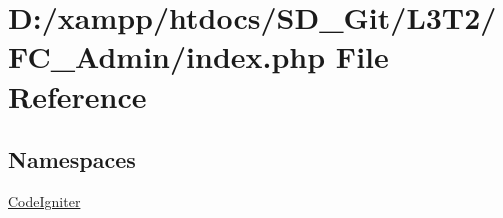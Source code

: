 \hypertarget{index_8php}{}\section{D\+:/xampp/htdocs/\+S\+D\+\_\+\+Git/\+L3\+T2/\+F\+C\+\_\+\+Admin/index.php File Reference}
\label{index_8php}
\subsection*{Namespaces}
\begin{DoxyCompactItemize}
\item 
 \hyperlink{namespace_code_igniter}{Code\+Igniter}
\end{DoxyCompactItemize}
